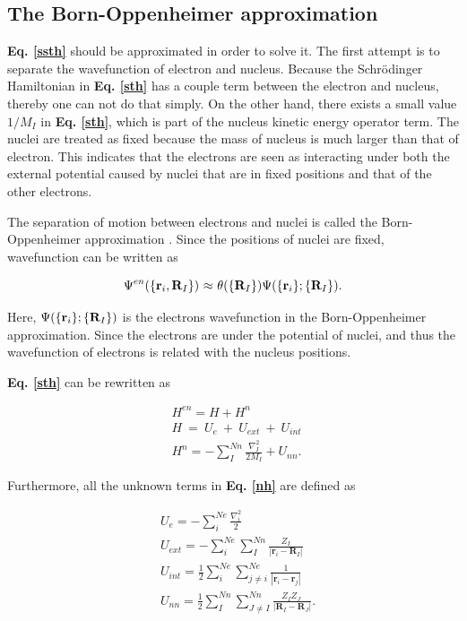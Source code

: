 \documentclass[a4paper, 12pt, titlepage,oneside,drop]{kthesis}
\begin{document}
\subsection{The Born-Oppenheimer approximation}
\label{ch:boa}

\textbf{Eq. \ref{ssth}} should be approximated in order to solve it. The first attempt is to separate the wavefunction of electron and nucleus. Because the Schrödinger Hamiltonian in \textbf{Eq. \ref{sth}} has a couple term between the electron and nucleus, 
thereby one can not do that simply. On the other hand, there exists a small value ${1}/{M_I}$ in \textbf{Eq. \ref{sth}}, which is part of the nucleus kinetic energy
operator term. The nuclei are treated as fixed because the mass of nucleus is much larger than that of electron. This indicates that the electrons are seen as interacting under both the external potential caused by nuclei 
that are in fixed positions and that of the other electrons. 

The separation of motion between electrons and nuclei is called the Born-Oppenheimer approximation \cite{bornoppenheimer}. Since the positions of nuclei are fixed, wavefunction can be written as

\begin{equation}\label{nwf}
{\Psi^{en}(\{ {\textbf r}_{i}, {\textbf R}_{I} \})} \   {\approx} \  {\theta(\{{\textbf R}_{I}\})} {\Psi(\{\textbf{r}_{i}\}; \{{\textbf R}_{I}\})}.
\end{equation}

Here, ${\Psi(\{\textbf{r}_{i}\}; \{{\textbf R}_{I}\})}$  is the electrons wavefunction in the Born-Oppenheimer approximation. Since the electrons are under the potential of nuclei, and thus the wavefunction of 
electrons is related with the nucleus positions. 
 
\textbf{Eq. \ref{sth}} can be rewritten as

\begin{equation}\begin{split}\label{nh}
& {H^{en}} = H + H^n \\
& {H}\ = \ {U_e} \ + \ {U}_{ext} \ + \ {U}_{int}\  \\
& {H^n} = - \sum\limits_I^{Nn} \frac{{{\nabla}_{{I}}^{2}}}{2 M_{I}} + {{U}_{nn}}.
 \end{split}
\end{equation}

Furthermore, all the unknown terms in \textbf{Eq. \ref{nh}} are defined as

\begin{equation}\begin{split}\label{vext}
& {U_e} = - \sum\limits_i^{{Ne}}   \frac{{{\nabla}_{{i}}^{2}}}{2} \\
& U_{ext} = - \sum\limits_i^{{Ne}} \sum\limits_I^{{Nn}} \frac{Z_{I}}{|\textbf{r}_{i}-\textbf{R}_{I}|} \\
& {U}_{int} =  \frac{1}{2} \sum\limits_i^{{Ne}} \sum\limits_{j \neq i}^{{Ne}} \frac{1}{ |\textbf{r}_{i}-\textbf{r}_{j}|} \\
& {{U}_{nn}} = \frac{1}{2} \sum\limits_I^{{Nn}} \sum\limits_{J \neq I}^{{Nn}} \frac{Z_{I} Z_{J}\ }{|\textbf{R}_{I}-\textbf{R}_{J}|}.
\end{split}
\end{equation}
\end{document}
